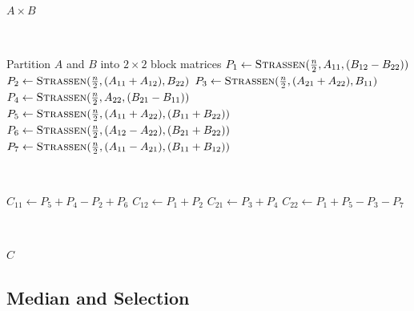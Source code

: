 \begin{algorithm}
    \begin{algorithmic}[1]
            \Return $A \times B$
        \EndIf

        {~~~}

        \State Partition $A$ and $B$ into $2 \times 2$ block matrices
        \State $P_1 \gets \Call{Strassen}{\frac{n}{2}, A_{11}, (B_{12} - B_{22})}$
        \State $P_2 \gets \Call{Strassen}{\frac{n}{2}, (A_{11} + A_{12}), B_{22}}$
        \State $P_3 \gets \Call{Strassen}{\frac{n}{2}, (A_{21} + A_{22}), B_{11}}$
        \State $P_4 \gets \Call{Strassen}{\frac{n}{2}, A_{22}, (B_{21} - B_{11})}$
        \State $P_5 \gets \Call{Strassen}{\frac{n}{2}, (A_{11} + A_{22}), (B_{11} + B_{22})}$
        \State $P_6 \gets \Call{Strassen}{\frac{n}{2}, (A_{12} - A_{22}), (B_{21} + B_{22})}$
        \State $P_7 \gets \Call{Strassen}{\frac{n}{2}, (A_{11} - A_{21}), (B_{11} + B_{12})}$

        {~~~}

        \State $C_{11} \gets P_5 + P_4 - P_2 + P_6$
        \State $C_{12} \gets P_1 + P_2$
        \State $C_{21} \gets P_3 + P_4$
        \State $C_{22} \gets P_1 + P_5 - P_3 - P_7$

        {~~~}

        \State \Return $C$
        \EndFunction
    \end{algorithmic}
\end{algorithm}

\subsection{Median and Selection}

